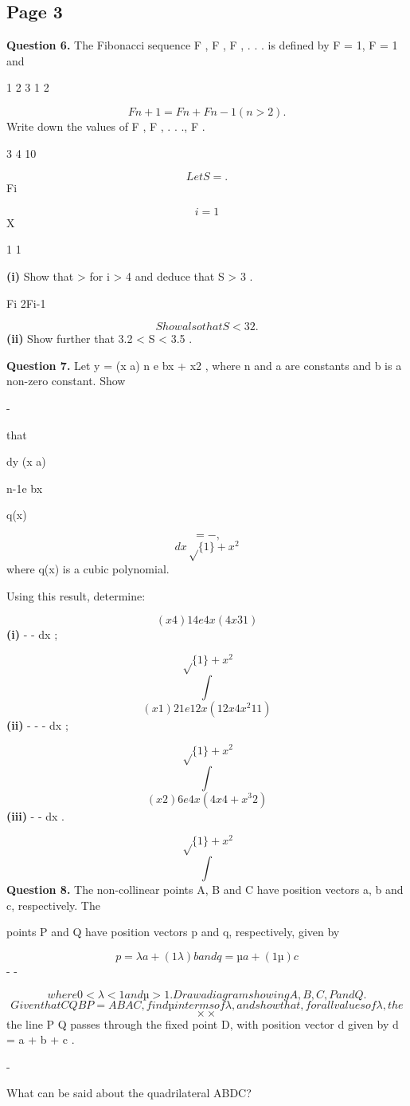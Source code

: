 \documentclass[12pt]{article}
\begin{document}
\subsection*{Page 3}
\begin{flushleft}
\bigskip\textbf{Question 6.} The Fibonacci sequence F , F , F , . . . is defined by F = 1, F = 1 and\par
1 2 3 1 2\par
\[Fn+1 = Fn + Fn-1 (n > 2).\]
Write down the values of F , F , . . ., F .\par
3 4 10\par
\infty\par
\[Let S = .\]
Fi\par
\[i=1\]
X\par
1 1\par
\textbf{(i)} Show that > for i > 4 and deduce that S > 3 .\par
Fi 2Fi-1\par
\[Show also that S < 3 2 .\]
\textbf{(ii)} Show further that 3.2 < S < 3.5 .\par
\bigskip\textbf{Question 7.} Let y = (x a) n e bx + x2 , where n and a are constants and b is a non-zero constant. Show\par
-\par
that\par
dy (x a)\par
n-1e bx\par
q(x)\par
\[= - ,\]
\[dx \sqrt\{1\} + x^2\]
where q(x) is a cubic polynomial.\par
Using this result, determine:\par
\[(x 4)14e4x (4x3 1)\]
\textbf{(i)} - - dx ;\par
\[\sqrt\{1\} + x^2\]
\[\int\]
\[(x 1)21e12x (12x4 x^2 11)\]
\textbf{(ii)} - - - dx ;\par
\[\sqrt\{1\} + x^2\]
\[\int\]
\[(x 2)6e4x (4x4 + x^3 2)\]
\textbf{(iii)} - - dx .\par
\[\sqrt\{1\} + x^2\]
\[\int\]
\bigskip\textbf{Question 8.} The non-collinear points A, B and C have position vectors a, b and c, respectively. The\par
points P and Q have position vectors p and q, respectively, given by\par
\[p = λa + (1 λ)b and q = µa + (1 µ)c\]
- -\par
\[where 0 < λ < 1 and µ > 1. Draw a diagram showing A, B, C, P and Q.\]
\[Given that CQ BP = AB AC, find µ in terms of λ, and show that, for all values of λ, the\]
\[\times \times\]
the line P Q passes through the fixed point D, with position vector d given by d = a + b + c .\par
-\par
What can be said about the quadrilateral ABDC?\par
\end{flushleft}
\end{document}
